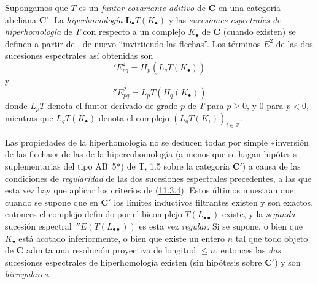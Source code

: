 \begin{env}[11.6.2]
\label{0.11.6.2}
\label{0.11.6.2-fr}
Supongamos que $T$ es un \emph{funtor covariante aditivo} de $\boldsymbol{C}$ en una categoría abeliana $\boldsymbol{C}'$.
La \emph{hiperhomología} $\mathbf{L}_\bullet T(K_\bullet)$ y las \emph{sucesiones espectrales de hiperhomología} de $T$ con respecto a un complejo $K_\bullet$ de $\boldsymbol{C}$ (cuando existen) se definen a partir de , de nuevo ``invirtiendo las flechas''.
Los términos $E^2$ de las dos sucesiones espectrales así obtenidas son
\[
\label{0.11.6.2.1-fr}
\tag{11.6.2.1}
{}'E^2_{pq}=H_p(L_qT(K_\bullet))
\]
y
\[
\label{0.11.6.2.2-fr}
\tag{11.6.2.2}
{}''E^2_{pq}=L_pT(H_q(K_\bullet))
\]
donde $L_pT$ denota el funtor derivado de grado $p$ de $T$ para $p\geq 0$, y $0$ para $p<0$, mientras que $L_qT(K_\bullet)$ denota el complejo $(L_qT(K_i))_{i\in\mathbb Z}$.

Las propiedades de la hiperhomología no se deducen todas por simple «inversión de las flechas» de las de la hipercohomología (a menos que se hagan hipótesis suplementarias del tipo AB~5*) de T, 1.5 sobre la categoría $\boldsymbol{C}'$) a causa de las condiciones de \emph{regularidad} de las dos sucesiones espectrales precedentes, a las que esta vez hay que aplicar los criterios de (\hyperref[0.11.3.4-fr]{11.3.4}). Estos últimos muestran que, cuando se supone que en $\boldsymbol{C}'$ los límites inductivos filtrantes existen y son exactos, entonces el complejo definido por el bicomplejo $T(L_{\bullet\bullet})$ existe, y la \emph{segunda} sucesión espectral $\,{}''E(T(L_{\bullet\bullet}))$ es esta vez \emph{regular}. Si se supone, o bien que $K_\bullet$ está acotado inferiormente, o bien que existe un entero $n$ tal que todo objeto de $\boldsymbol{C}$ admita una resolución proyectiva de longitud $\leq n$, entonces las \emph{dos} sucesiones espectrales de hiperhomología existen (sin hipótesis sobre $\boldsymbol{C}'$) y son \emph{birregulares}.
\end{env}


